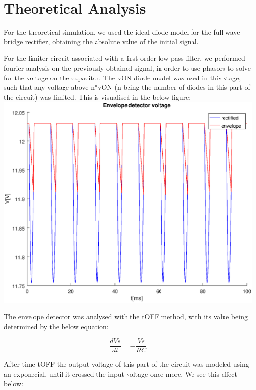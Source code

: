 \section{Theoretical Analysis}
\label{sec:analysis}

For the theoretical simulation, we used the ideal diode model for the full-wave bridge rectifier, obtaining the absolute value of the initial signal.

For the limiter circuit associated with a first-order low-pass filter, we performed fourier analysis on the previously obtained signal, in order to use phasors to solve for the voltage on the capacitor.
The vON diode model was used in this stage, such that any voltage above n*vON (n being the number of diodes in this part of the circuit) was limited.
This is visualised in the below figure:
\includegraphics[width=1\linewidth]{venvelope.eps}

The envelope detector was analysed with the tOFF method, with its value being determined by the below equation:



\begin{equation}
	\frac{dVs}{dt}=-\frac{Vs}{RC}
\end{equation}

After time tOFF the output voltage of this part of the circuit was modeled using an exponecial, until it crossed the input voltage once more.
We see this effect below:

